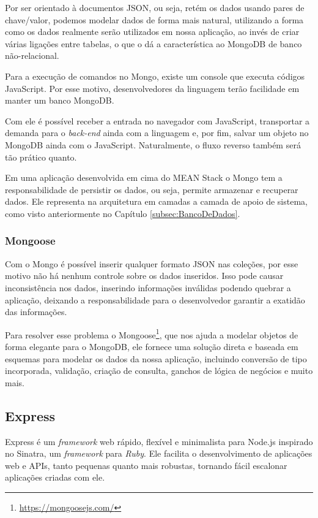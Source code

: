 \documentclass[
	12pt,				%
	openright,			%
	twoside,			%
	a4paper,			%
	english,			%
	brazil				%
	]{abntex2}
\begin{document}
Por ser orientado à documentos JSON, ou seja, retém os dados usando pares de chave/valor, podemos modelar dados de forma mais natural, utilizando a forma como os dados realmente serão utilizados em nossa aplicação, ao invés de criar várias ligações entre tabelas, o que o dá a característica ao MongoDB de banco não-relacional.

Para a execução de comandos no Mongo, existe um console que executa códigos JavaScript. Por esse motivo, desenvolvedores da linguagem terão facilidade em manter um banco MongoDB.

Com ele é possível receber a entrada no navegador com JavaScript, transportar a demanda para o \textit{back-end} ainda com a linguagem e, por fim, salvar um objeto no MongoDB ainda com o JavaScript. Naturalmente, o fluxo reverso também será tão prático quanto.

Em uma aplicação desenvolvida em cima do MEAN Stack o Mongo tem a responsabilidade de persistir os dados, ou seja, permite armazenar e recuperar dados. Ele representa na arquitetura em camadas a camada de apoio de sistema, como visto anteriormente no Capítulo \ref{subsec:BancoDeDados}.

\subsubsection{Mongoose}

Com o Mongo é possível inserir qualquer formato JSON nas coleções, por esse motivo não há nenhum controle sobre os dados inseridos. Isso pode causar inconsistência nos dados, inserindo informações inválidas podendo quebrar a aplicação, deixando a responsabilidade para o desenvolvedor garantir a exatidão das informações.

Para resolver esse problema o Mongoose\footnote{\url{https://mongoosejs.com/}}, que nos ajuda a modelar objetos de forma elegante para o MongoDB, ele fornece uma solução direta e baseada em esquemas para modelar os dados da nossa aplicação, incluindo conversão de tipo incorporada, validação, criação de consulta, ganchos de lógica de negócios e muito mais.

\subsection{Express}

Express é um \textit{framework} web rápido, flexível e minimalista para Node.js inspirado no Sinatra, um \textit{framework} para \textit{Ruby}. Ele facilita o desenvolvimento de aplicações web e APIs, tanto pequenas quanto mais robustas, tornando fácil escalonar aplicações criadas com ele.
\end{document}
